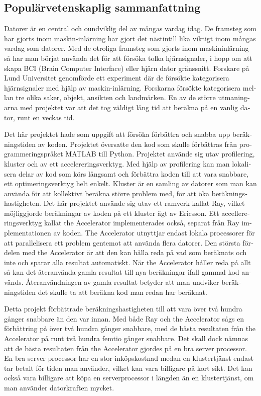 \documentclass[12pt, a4paper]{article}
\begin{document}
\begin{otherlanguage}{swedish}
\section*{Populärvetenskaplig sammanfattning}
Datorer är en central och oundviklig del av mångas vardag idag.
De framsteg som har gjorts inom maskin-inlärning har gjort det nästintill lika viktigt inom mångas vardag som datorer.
Med de otroliga framsteg som gjorts inom maskininlärning så har man börjat använda det för att försöka tolka hjärnsignaler, i hopp om att skapa BCI (Brain Computer Interface) eller hjärn dator gränssnitt.
Forskare på Lund Universitet genomförde ett experiment där de försökte kategorisera hjärnsignaler med hjälp av maskin-inlärning.
Forskarna försökte kategorisera mellan tre olika saker, objekt, ansikten och landmärken.
En av de större utmaningarna med projektet var att det tog väldigt lång tid att beräkna på en vanlig dator, runt en veckas tid.

Det här projektet hade som uppgift att försöka förbättra och snabba upp beräkningstiden av koden.
Projektet översatte den kod som skulle förbättras från programmeringspråket MATLAB till Python.
Projektet använde sig utav profilering, kluster och av ett accelereringsverktyg.
Med hjälp av profilering kan man lokalisera delar av kod som körs långsamt och förbättra koden till att vara snabbare, ett optimeringsverktyg helt enkelt.
Kluster är en samling av datorer som man kan använda för att kollektivt beräkna större problem med, för att öka beräkningshastigheten.
Det här projektet använde sig utav ett ramverk kallat Ray, vilket möjliggjorde beräkningar av koden på ett kluster ägt av Ericsson.
Ett accellereringsverktyg kallat the Accelerator implementerades också, separat från Ray implementationen av koden.
The Accelerator utnyttjar endast lokala processorer för att parallelisera ett problem gentemot att använda flera datorer.
Den största fördelen med the Accelerator är att den kan hålla reda på vad som beräknats och inte och sparar alla resultat automatiskt.
När the Accelerator håller reda på allt så kan det återanvända gamla resultat till nya beräkningar ifall gammal kod används.
Återanvändningen av gamla resultat betyder att man undviker beräkningstiden det skulle ta att beräkna kod man redan har beräknat.

Detta projekt förbättrade beräkningshastigheten till att vara över två hundra gånger snabbare än den var innan.
Med både Ray och the Accelerator sågs en förbättring på över två hundra gånger snabbare, med de bästa resultaten från the Accelerator på runt två hundra femtio gånger snabbare.
Det skall dock nämnas att de bästa resultaten från the Accelerator gjordes på en bra server processor.
En bra server processor har en stor inköpskostnad medan en klustertjänst endast tar betalt för tiden man använder, vilket kan vara billigare på kort sikt.
Det kan också vara billigare att köpa en serverprocessor i längden än en klustertjänst, om man använder datorkraften mycket.


\end{otherlanguage}
\end{document}
